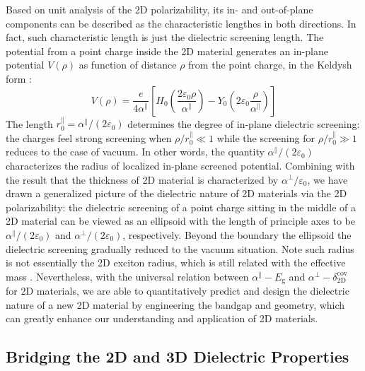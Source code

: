 \documentclass[journal=ancac3,manuscript=article,email=true,hyperref=true,keywords=false]{achemso}
\begin{document}
Based on unit analysis of the 2D polarizability, its in- and
out-of-plane components can be described as the characteristic
lengthes in both directions. In fact, such characteristic length is
just the dielectric screening length. The potential from a point
charge inside the 2D material generates an in-plane potential
$V(\rho)$ as function of distance $\rho$ from the point charge, in the
Keldysh form \cite{Keldysh_1979_eps_multi,Pulci_2014}:
\begin{equation}
  \label{eq:Keldysh}
  V(\rho) = \frac{e}{4 \alpha^{\parallel}}
  \left[H_{0}(\frac{2\varepsilon_{0}\rho}{\alpha^{\parallel}})
    - Y_{0}(2 \varepsilon_{0}\frac{\rho}{\alpha^{\parallel}})\right]
\end{equation}
The length $r^{\parallel}_{0} = \alpha^{\parallel}/(2\varepsilon_{0})$
determines the degree of in-plane dielectric screening: the charges
feel strong screening when $\rho/r^{\parallel}_{0} \ll 1$ while the
screening for $\rho/r^{\parallel}_{0} \gg 1$ reduces to the case of
vacuum. In other words, the quantity
$\alpha^{\parallel}/(2\varepsilon_{0})$ characterizes the radius of
localized in-plane screened potential. Combining with the result that
the thickness of 2D material is characterized by
$\alpha^{\perp}/\varepsilon_{0}$, we have drawn a generalized picture
of the dielectric nature of 2D materials via the 2D polarizability:
the dielectric screening of a point charge sitting in the middle of a
2D material can be viewed as an ellipsoid with the length of
principle axes to be $\alpha^{\parallel}/(2 \varepsilon_{0})$ and
$\alpha^{\perp}/(2 \varepsilon_{0})$, respectively. Beyond the
boundary the ellipsoid the dielectric screening gradually reduced to
the vacuum situation. Note such radius is not essentially the 2D
exciton radius, which is still related with the effective mass
\cite{Chernikov_2014_EB_MoS2_2D3D}. Nevertheless, with the universal
relation between $\alpha^{\parallel}-E_{\mathrm{g}}$ and
$\alpha^{\perp}-\delta_{\mathrm{2D}}^{\mathrm{cov}}$ for 2D materials,
we are able to quantitatively predict and design the dielectric nature
of a new 2D material by engineering the bandgap and geometry, which
can greatly enhance our understanding and application of 2D materials.

\fi


\subsection{Bridging the 2D and 3D Dielectric Properties}
\label{sec:2D-3D}
\end{document}
